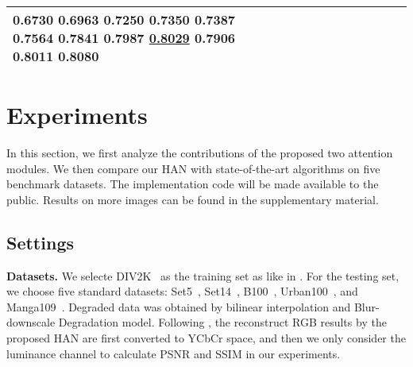 \documentclass[runningheads]{llncs}
\begin{document}
\begin{table}[!ht]
\begin{tabular}{|p{7em}|p{2.5em}|p{2.5em}|p{3em}|p{2.5em}|p{3em}|p{2.5em}|p{3em}|p{2.5em}|p{3em}|p{2.5em}|p{3em}|}
0.6730\newline{} 0.6963\newline{} 0.7250\newline{} 0.7350\newline{} 0.7387\newline{} 0.7564\newline{} 0.7841\newline{} 0.7987\newline{} \underline{0.8029} \newline{}0.7906 \newline{}0.8011 \newline{}\bfseries{0.8080}  \\
		\hline
	\end{tabular}\label{table-BI}\end{table}











\section{Experiments}
\label{sec-exp}
In this section, we first analyze the contributions of the proposed two attention modules. We then compare our HAN with state-of-the-art algorithms on five benchmark datasets. 
The implementation code will be made available to the public. Results on more images can be found in the supplementary material.

\subsection{Settings}
\noindent\textbf{Datasets.} We selecte DIV2K~\cite{timofte2017ntire} as the training set as like in \cite{zhang2018image,dai2019second,zhang2018residual,lim2017enhanced}.
For the testing set, we choose five standard datasets: Set5~\cite{bevilacqua2012low}, Set14~\cite{zeyde2010single}, B100~\cite{martin2001database}, Urban100~\cite{huang2015single}, and Manga109~\cite{matsui2017sketch}. Degraded data was obtained by bilinear interpolation and Blur-downscale Degradation model. 
Following \cite{zhang2018image}, the reconstruct RGB results by the proposed HAN are first converted to YCbCr space, and then we only consider the luminance channel to calculate PSNR and SSIM in our experiments.
\end{document}
